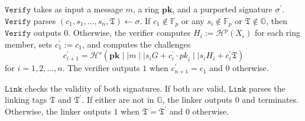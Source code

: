 \documentclass[draft]{llncs} %
\begin{document}
\begin{example}
$\texttt{Verify}$ takes as input a message $m$, a ring $\textbf{pk}$, and a purported signature $\sigma^\prime$. $\texttt{Verify}$ parses $(c_1, s_1, \ldots, s_n, \mathfrak{T}) \leftarrow \sigma$. If $c_1 \notin \mathbb{F}_p$ or any $s_i \notin \mathbb{F}_p$ or $\mathfrak{T} \notin \mathbb{G}$, then $\texttt{Verify}$ outputs $0$. Otherwise, the verifier computes $H_i := \mathcal{H}^p(X_i)$ for each ring member, sets $c_1^\prime := c_1$, and computes the challenges $$c_{i+1}^\prime = \mathcal{H}^s(\textbf{pk} \mid \mid m \mid \mid s_i G + c_i^\prime \cdot \textit{pk}_i \mid \mid s_i H_i + c_i^\prime \mathfrak{T})$$ for $i=1, 2, \ldots, n$. The verifier outputs $1$ when $c_{n+1}^\prime = c_1$ and $0$ otherwise.

$\texttt{Link}$ checks the validity of both signatures. If both are valid, $\texttt{Link}$ parses the linking tags $\mathfrak{T}$ and $\mathfrak{T}^\prime$. If either are not in $\mathbb{G}$, the linker outputs $0$ and terminates. Otherwise, the linker outputs $1$ when $\mathfrak{T} = \mathfrak{T}^\prime$ and $0$ otherwise.
\end{example}
\end{document}
